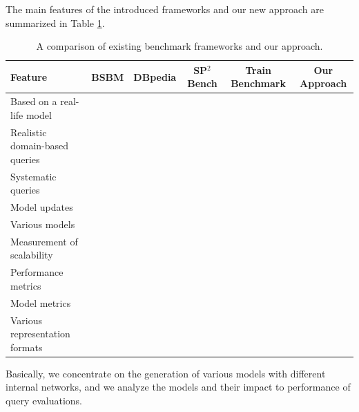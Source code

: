 The main features of the introduced frameworks and our new approach are summarized in Table \ref{tab:framework_features}.
\begin{table}[ht]
	\footnotesize
	\centering
	\begin{tabular}{l c c c c c}
		\toprule
		Feature & BSBM & DBpedia & SP$^2$Bench & Train Benchmark & Our Approach\\ \hline
		\midrule
		Based on a real-life model &  & \textbullet & \textbullet & &  \\ \hline
		Realistic domain-based queries & \textbullet & \textbullet &  &  & \\ \hline
		Systematic queries  & &  & \textbullet & & \\ \hline
		Model updates & \textbullet &  &  & \textbullet & \\ \hline
		Various models &  &  &  & & \textbullet \\ \hline
		Measurement of scalability  & \textbullet & \textbullet & \textbullet & \textbullet & \textbullet\\ \hline
		Performance metrics  & \textbullet & \textbullet & \textbullet & &  \\ \hline
		Model metrics &  &  &  & \textbullet & \textbullet \\ \hline
		Various representation formats & &  &  & \textbullet & \\ \hline
		\bottomrule
	\end{tabular}
	\caption{A comparison of existing benchmark frameworks and our approach.}
	\label{tab:framework_features}
\end{table}

Basically, we concentrate on the generation of various models with different internal networks, and we analyze the models and their impact to performance of query evaluations.